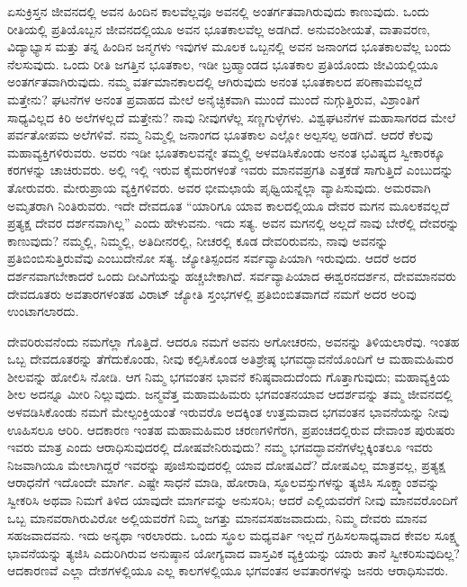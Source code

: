 ಏಸುಕ್ರಿಸ್ತನ ಜೀವನದಲ್ಲಿ ಅವನ ಹಿಂದಿನ ಕಾಲವೆಲ್ಲವೂ ಅವನಲ್ಲಿ ಅಂತರ್ಗತವಾಗಿರುವುದು ಕಾಣುವುದು. ಒಂದು ರೀತಿಯಲ್ಲಿ ಪ್ರತಿಯೊಬ್ಬನ ಜೀವನದಲ್ಲಿಯೂ ಅವನ ಭೂತಕಾಲವೆಲ್ಲ ಅಡಗಿದೆ. ಅನುವಂಶೀಯತೆ, ವಾತಾವರಣ, ವಿದ್ಯಾಭ್ಯಾಸ ಮತ್ತು ತನ್ನ ಹಿಂದಿನ ಜನ್ಮಗಳು ಇವುಗಳ ಮೂಲಕ ಒಬ್ಬನಲ್ಲಿ ಅವನ ಜನಾಂಗದ ಭೂತಕಾಲವೆಲ್ಲ ಬಂದು ನೆಲಸುವುದು. ಒಂದು ರೀತಿ ಜಗತ್ತಿನ ಭೂತಕಾಲ, ಇಡೀ ಬ್ರಹ್ಮಾಂಡದ ಭೂತಕಾಲ ಪ್ರತಿಯೊಂದು ಜೀವಿಯಲ್ಲಿಯೂ ಅಂತರ್ಗತವಾಗಿರುವುದು. ನಮ್ಮ ವರ್ತಮಾನಕಾಲದಲ್ಲಿ ಆಗಿರುವುದು ಅನಂತ ಭೂತಕಾಲದ ಪರಿಣಾಮವಲ್ಲದೆ ಮತ್ತೇನು? ಘಟನೆಗಳ ಅನಂತ ಪ್ರವಾಹದ ಮೇಲೆ ಅನೈಚ್ಛಿಕವಾಗಿ ಮುಂದೆ ಮುಂದೆ ನುಗ್ಗುತ್ತಿರುವ, ವಿಶ್ರಾಂತಿಗೆ ಸಾಧ್ಯವಿಲ್ಲದ ಕಿರಿ ಅಲೆಗಳಲ್ಲದೆ ಮತ್ತೇನು? ನಾವು ನೀವುಗಳೆಲ್ಲ ಸಣ್ಣಗುಳ್ಳೆಗಳು. ವಿಶ್ವಘಟನೆಗಳ ಮಹಾಸಾಗರದ ಮೇಲೆ ಪರ್ವತೋಪಮ ಅಲೆಗಳಿವೆ. ನಮ್ಮ ನಿಮ್ಮಲ್ಲಿ ಜನಾಂಗದ ಭೂತಕಾಲ ಎಲ್ಲೋ ಅಲ್ಪಸಲ್ಪ ಅಡಗಿದೆ. ಆದರೆ ಕೆಲವು ಮಹಾವ್ಯಕ್ತಿಗಳಿರುವರು. ಅವರು ಇಡೀ ಭೂತಕಾಲವನ್ನೇ ತಮ್ಮಲ್ಲಿ ಅಳವಡಿಸಿಕೊಂಡು ಅನಂತ ಭವಿಷ್ಯದ ಸ್ವೀಕಾರಕ್ಕೂ ಕರಗಳನ್ನು ಚಾಚಿರುವರು. ಅಲ್ಲಿ ಇಲ್ಲಿ ಇರುವ ಕೈಮರಗಳಂತೆ ಇವರು ಮಾನವಪ್ರಗತಿ ಎತ್ತಕಡೆ ಸಾಗುತ್ತಿದೆ ಎಂಬುದನ್ನು ತೋರುವರು. ಮೇರುಪ್ರಾಯ ವ್ಯಕ್ತಿಗಳಿವರು. ಅವರ ಭೀಮಛಾಯೆ ಪೃಥ್ವಿಯನ್ನೆಲ್ಲಾ ವ್ಯಾಪಿಸುವುದು. ಅಮರವಾಗಿ ಅಮೃತರಾಗಿ ನಿಂತಿರುವರು. ಇದೇ ದೇವದೂತ “ಯಾರಿಗೂ ಯಾವ ಕಾಲದಲ್ಲಿಯೂ ದೇವರ ಮಗನ ಮೂಲಕವಲ್ಲದೆ ಪ್ರತ್ಯಕ್ಷ ದೇವರ ದರ್ಶನವಾಗಿಲ್ಲ” ಎಂದು ಹೇಳುವನು. ಇದು ಸತ್ಯ. ಅವನ ಮಗನಲ್ಲಿ ಅಲ್ಲದೆ ನಾವು ಬೇರೆಲ್ಲಿ ದೇವರನ್ನು ಕಾಣುವುದು? ನಮ್ಮಲ್ಲಿ, ನಿಮ್ಮಲ್ಲಿ, ಅತಿದೀನರಲ್ಲಿ, ನೀಚರಲ್ಲಿ ಕೂಡ ದೇವರಿರುವನು, ನಾವು ಅವನನ್ನು ಪ್ರತಿಬಿಂಬಿಸುತ್ತಿರುವೆವು ಎಂಬುದೇನೋ ಸತ್ಯ. ಜ್ಯೋತಿಸ್ಪಂದನ ಸರ್ವವ್ಯಾಪಿಯಾಗಿ ಇರುವುದು. ಆದರೆ ಅದರ ದರ್ಶನವಾಗಬೇಕಾದರೆ ಒಂದು ದೀವಿಗೆಯನ್ನು ಹಚ್ಚಬೇಕಾಗಿದೆ. ಸರ್ವವ್ಯಾಪಿಯಾದ ಈಶ್ವರನದರ್ಶನ, ದೇವಮಾನವರು ದೇವದೂತರು ಅವತಾರಗಳಂತಹ ವಿರಾಟ್​ ಜ್ಯೋತಿ ಸ್ತಂಭಗಳಲ್ಲಿ ಪ್ರತಿಬಿಂಬಿತವಾಗದೆ ನಮಗೆ ಅದರ ಅರಿವು ಉಂಟಾಗಲಾರದು.

ದೇವರಿರುವನೆಂದು ನಮಗೆಲ್ಲಾ ಗೊತ್ತಿದೆ. ಆದರೂ ನಮಗೆ ಅವನು ಅಗೋಚರನು, ಅವ\-ನನ್ನು ತಿಳಿಯಲಾರೆವು. ಇಂತಹ ಒಬ್ಬ ದೇವದೂತರನ್ನು ತೆಗೆದುಕೊಂಡು, ನೀವು ಕಲ್ಪಿಸಿ\break ಕೊಂಡ ಅತಿಶ್ರೇಷ್ಠ ಭಗವದ್ಭಾವನೆಯೊಂದಿಗೆ ಆ ಮಹಾಮಹಿಮರ ಶೀಲವನ್ನು ಹೋಲಿಸಿ ನೋಡಿ. ಆಗ ನಿಮ್ಮ ಭಗವಂತನ ಭಾವನೆ ಕನಿಷ್ಠವಾದುದೆಂದು ಗೊತ್ತಾಗುವುದು; ಮಹಾ\break ವ್ಯಕ್ತಿಯ ಶೀಲ ಅದನ್ನೂ ಮೀರಿ ನಿಲ್ಲುವುದು. ಜನ್ಮವೆತ್ತ ಮಹಾಮಹಿಮರು ಭಗವಂತನ\break ಯಾವ ಆದರ್ಶವನ್ನು ತಮ್ಮ ಜೀವನದಲ್ಲಿ ಅಳವಡಿಸಿಕೊಂಡು ನಮಗೆ ಮೇಲ್ಪಂಕ್ತಿಯಂತೆ ಇರುವರೊ ಅದಕ್ಕಿಂತ ಉತ್ತಮವಾದ ಭಗವಂತನ ಭಾವನೆಯನ್ನು ನೀವು ಊಹಿಸಲೂ ಆರಿರಿ. ಆದಕಾರಣ ಇಂತಹ ಮಹಾಮಹಿಮರ ಚರಣಗಳಿಗೆರಗಿ, ಪ್ರಪಂಚದಲ್ಲಿರುವ ದೇವಾಂಶ ಪುರುಷರು ಇವರು ಮಾತ್ರ ಎಂದು ಆರಾಧಿಸುವುದರಲ್ಲಿ ದೋಷವೇನಿರುವುದು?\- ನಮ್ಮ ಭಗವದ್ಭಾವನೆಗಳೆಲ್ಲಕ್ಕಿಂತಲೂ ಇವರು ನಿಜವಾಗಿಯೂ ಮೇಲಾಗಿದ್ದರೆ ಇವರನ್ನು ಪೂಜಿಸುವುದರಲ್ಲಿ ಯಾವ ದೋಷವಿದೆ? ದೋಷವಿಲ್ಲ ಮಾತ್ರವಲ್ಲ, ಪ್ರತ್ಯಕ್ಷ ಆರಾಧನೆಗೆ ಇದೊಂದೇ ಮಾರ್ಗ. ಎಷ್ಟೇ ಸಾಧನೆ ಮಾಡಿ, ಹೋರಾಡಿ, ಸ್ಥೂಲವಸ್ತುಗಳನ್ನು ತ್ಯಜಿಸಿ ಸೂಕ್ಷ್ಮಾಂಶವನ್ನು ಸ್ವೀಕರಿಸಿ ಅಥವಾ ನಿಮಗೆ ತಿಳಿದ ಯಾವುದೇ ಮಾರ್ಗವನ್ನು ಅನುಸರಿಸಿ; ಆದರೆ ಎಲ್ಲಿಯವರೆಗೆ ನೀವು ಮಾನವರೊಂದಿಗೆ ಒಬ್ಬ ಮಾನವರಾಗಿರುವಿರೋ ಅಲ್ಲಿಯ\-ವರೆಗೆ ನಿಮ್ಮ ಜಗತ್ತು ಮಾನವಸಹಜವಾದುದು, ನಿಮ್ಮ ದೇವರು ಮಾನವ ಸಹಜವಾದವನು. ಇದು ಅನ್ಯಥಾ ಇರಲಾರದು. ಒಂದು ಸ್ಥೂಲ ಮಧ್ಯವರ್ತಿ ಇಲ್ಲದೆ ಗ್ರಹಿಸಲಸಾಧ್ಯವಾದ ಕೇವಲ ಸೂಕ್ಷ್ಮ ಭಾವನೆಯನ್ನು ತ್ಯಜಿಸಿ ಎದುರಿಗಿರುವ ಅನುಷ್ಠಾನ ಯೋಗ್ಯವಾದ ವಾಸ್ತವಿಕ ವ್ಯಕ್ತಿಯನ್ನು ಯಾರು ತಾನೆ ಸ್ವೀಕರಿಸುವುದಿಲ್ಲ? ಆದಕಾರಣವೆ ಎಲ್ಲಾ ದೇಶಗಳಲ್ಲಿಯೂ ಎಲ್ಲ ಕಾಲಗಳಲ್ಲಿಯೂ ಭಗವಂತನ ಅವತಾರಗಳನ್ನು ಜನರು ಆರಾಧಿಸುವರು.

